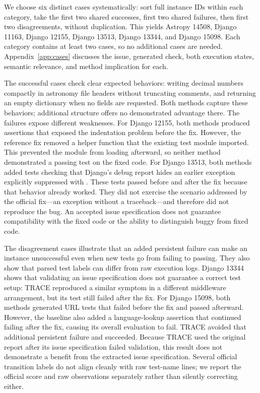 We choose six distinct cases systematically: sort full instance IDs within each category, take the first two shared successes, first two shared failures, then first two disagreements, without duplication. This yields Astropy 14508, Django 11163, Django 12155, Django 13513, Django 13344, and Django 15098. Each category contains at least two cases, so no additional cases are needed. Appendix~\ref{app:cases} discusses the issue, generated check, both execution states, semantic relevance, and method implication for each.

The successful cases check clear expected behaviors: writing decimal numbers compactly in astronomy file headers without truncating comments, and returning an empty dictionary when no fields are requested. Both methods capture these behaviors; additional structure offers no demonstrated advantage there. The failures expose different weaknesses. For Django 12155, both methods produced assertions that exposed the indentation problem before the fix. However, the reference fix removed a helper function that the existing test module imported. This prevented the module from loading afterward, so neither method demonstrated a passing test on the fixed code. For Django 13513, both methods added tests checking that Django's debug report hides an earlier exception explicitly suppressed with . These tests passed before and after the fix because that behavior already worked. They did not exercise the scenario addressed by the official fix---an exception without a traceback---and therefore did not reproduce the bug. An accepted issue specification does not guarantee compatibility with the fixed code or the ability to distinguish buggy from fixed code.

The disagreement cases illustrate that an added persistent failure can make an instance unsuccessful even when new tests go from failing to passing. They also show that parsed test labels can differ from raw execution logs. Django 13344 shows that validating an issue specification does not guarantee a correct test setup: TRACE reproduced a similar symptom in a different middleware arrangement, but its test still failed after the fix. For Django 15098, both methods generated URL tests that failed before the fix and passed afterward. However, the baseline also added a language-lookup assertion that continued failing after the fix, causing its overall evaluation to fail. TRACE avoided that additional persistent failure and succeeded. Because TRACE used the original report after its issue specification failed validation, this result does not demonstrate a benefit from the extracted issue specification. Several official transition labels do not align cleanly with raw test-name lines; we report the official score and raw observations separately rather than silently correcting either.

